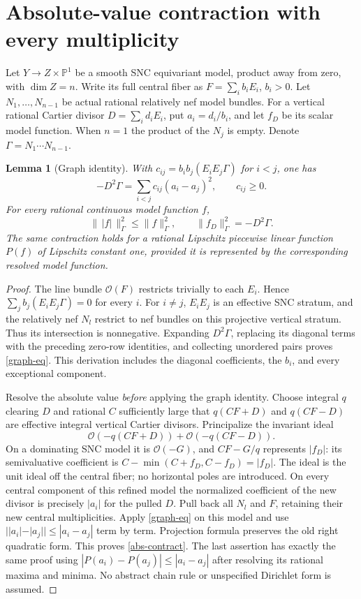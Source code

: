 \documentclass[10pt]{article}
\newtheorem{lemma}[theorem]{Lemma}
\newcommand{\OO}{\mathcal O}
\begin{document}
\section{Absolute-value contraction with every multiplicity}
Let $Y\to Z\times\mathbb P^1$ be a smooth SNC equivariant model, product
away from zero, with $\dim Z=n$. Write its full central fiber as
$F=\sum_i b_iE_i$, $b_i>0$. Let $N_1,\ldots,N_{n-1}$ be actual rational
relatively nef model bundles. For a vertical rational Cartier divisor
$D=\sum_i d_iE_i$, put $a_i=d_i/b_i$, and let $f_D$ be its scalar model
function. When $n=1$ the product of the $N_j$ is empty.
Denote $\Gamma=N_1\cdots N_{n-1}$.

\begin{lemma}[Graph identity]\label{graph}
With $c_{ij}=b_ib_j(E_iE_j\Gamma)$ for $i<j$, one has
\begin{equation}\label{graph-eq}
 -D^2\Gamma=\sum_{i<j}c_{ij}(a_i-a_j)^2,\qquad c_{ij}\geq0.
\end{equation}
For every rational continuous model function $f$,
\begin{equation}\label{abs-contract}
 \|\,|f|\,\|_\Gamma^2\leq\|f\|_\Gamma^2,
 \qquad\|f_D\|_\Gamma^2=-D^2\Gamma.
\end{equation}
The same contraction holds for a rational Lipschitz piecewise linear
function $P(f)$ of Lipschitz constant one, provided it is represented by
the corresponding resolved model function.
\end{lemma}
\begin{proof}
The line bundle $\OO(F)$ restricts trivially to each $E_i$. Hence
$\sum_j b_j(E_iE_j\Gamma)=0$ for every $i$. For $i\ne j$, $E_iE_j$ is
an effective SNC stratum, and the relatively nef $N_l$ restrict to nef
bundles on this projective vertical stratum. Thus its intersection is
nonnegative. Expanding $D^2\Gamma$, replacing its diagonal terms with
the preceding zero-row identities, and collecting unordered pairs proves
\eqref{graph-eq}. This derivation includes the diagonal coefficients,
the $b_i$, and every exceptional component.

Resolve the absolute value \emph{before} applying the graph identity.
Choose integral $q$ clearing $D$ and rational $C$ sufficiently large that
$q(CF+D)$ and $q(CF-D)$ are effective integral vertical Cartier divisors.
Principalize the invariant ideal
\[
 \OO(-q(CF+D))+\OO(-q(CF-D)).
\]
On a dominating SNC model it is $\OO(-G)$, and $CF-G/q$ represents
$|f_D|$: its semivaluative coefficient is
$C-\min(C+f_D,C-f_D)=|f_D|$.
The ideal is the unit ideal off the central fiber; no horizontal poles
are introduced. On every central component of this refined model the
normalized coefficient of the new divisor is precisely $|a_i|$ for the
pulled $D$. Pull back all $N_l$ and $F$, retaining their new central
multiplicities. Apply \eqref{graph-eq} on this model and use
$||a_i|-|a_j||\leq|a_i-a_j|$ term by term. Projection formula preserves
the old right quadratic form. This proves \eqref{abs-contract}.
The last assertion has exactly the same proof using
$|P(a_i)-P(a_j)|\leq|a_i-a_j|$ after resolving its rational maxima and
minima. No abstract chain rule or unspecified Dirichlet form is assumed.
\end{proof}
\end{document}
